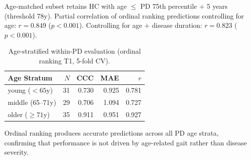 \documentclass[11pt,a4paper]{article}
\newcommand{\tabnote}[1]{\par\vspace{2pt}\noindent\begin{minipage}{\linewidth}\small\itshape\raggedright #1\par\end{minipage}\par\vspace{0.4em}}
\begin{document}
\begin{table}[H]
\centering
\caption{Age confound sensitivity analysis for ordinal ranking (5-fold CV, T1 observable subscore).}
\label{tab:age}
\small
{}%
\tabnote{Age-matched subset retains HC with age $\le$ PD 75th percentile $+$ 5 years (threshold 78y). Partial correlation of ordinal ranking predictions controlling for age: $r=0.849$ ($p<0.001$). Controlling for age $+$ disease duration: $r=0.823$ ($p<0.001$).}
\end{table}

\begin{table}[H]
\centering
\caption{Age-stratified within-PD evaluation (ordinal ranking T1, 5-fold CV).}
\label{tab:agestrat}
\begin{tabular}{lrrrr}
\toprule
\textbf{Age Stratum} & \textbf{$N$} & \textbf{CCC} & \textbf{MAE} & \textbf{$r$} \\
\midrule
young ($<65$y)     & 31 & 0.730 & 0.925 & 0.781 \\
middle (65--71y)   & 29 & 0.706 & 1.094 & 0.727 \\
older ($\ge 71$y)  & 35 & 0.911 & 0.951 & 0.927 \\
\bottomrule
\end{tabular}
\tabnote{Ordinal ranking produces accurate predictions across all PD age strata, confirming that performance is not driven by age-related gait rather than disease severity.}
\end{table}
\end{document}
